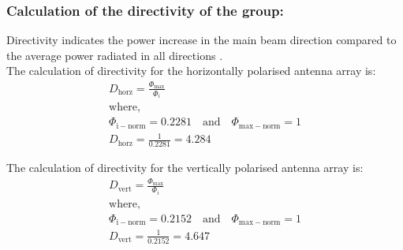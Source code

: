 \subsubsection{\textbf{Calculation of the directivity of the group:}}
Directivity indicates the power increase in the main beam direction compared to the average
power radiated in all directions \cite{lec-script}.\\
The calculation of directivity for the horizontally polarised antenna array is:
\begin{gather}
	D_{\mathrm{horz}} = \frac{\Phi_{\mathrm{max}}}{\Phi_i}	\nonumber \\
	\mathrm{where,\quad} 	\nonumber \\
	\Phi_{\mathrm{i-norm}} = 0.2281 \mathrm{\quad and \quad} \Phi_{\mathrm{max-norm}} = 1 	\nonumber \\
	\boxed{D_{\mathrm{horz}} = \frac{1}{0.2281} = 4.284}
\end{gather}

The calculation of directivity for the vertically polarised antenna array is:
\begin{gather}
	D_{\mathrm{vert}} = \frac{\Phi_{\mathrm{max}}}{\Phi_i}	\nonumber \\
	\mathrm{where,\quad} 	\nonumber \\
	\Phi_{\mathrm{i-norm}} = 0.2152 \mathrm{\quad and \quad} \Phi_{\mathrm{max-norm}} = 1 	\nonumber \\
	\boxed{D_{\mathrm{vert}} = \frac{1}{0.2152} = 4.647}
\end{gather}

